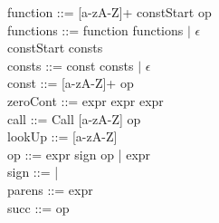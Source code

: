 function ::= [a-zA-Z]+ \bnf{=>} constStart op\\

functions ::= \bnf{,} function functions $\mid$ $\epsilon$\\

constStart \bnf{[} consts \bnf{]}\\

consts ::= const \bnf{,} consts $\mid$ $\epsilon$\\

const ::= [a-zA-Z]+ \bnf{=} op\\

zeroCont ::=  \bnf{(} expr \bnf{)} \bnf{\{} expr \bnf{\}}  \bnf{\{} expr \bnf{\}}\\

call ::= Call [a-zA-Z] op\\

lookUp ::=  [a-zA-Z]\\

op ::= expr sign op | expr\\

sign ::= \bnf{+} | \bnf{*}\\

parens ::=\bnf{(} expr \bnf{)}\\

succ ::=  op\\

